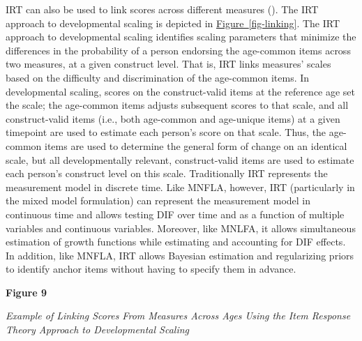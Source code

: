 \documentclass[
  american,
  letterpaper,
  12pt]{article}
\newcommand{\apafloattitle}[1]{%
  {\par\noindent\bfseries #1\par\nopagebreak}}
\newcommand{\apafloatcaption}[1]{%
  {\par\noindent\itshape\interlinepenalty10000 #1\par\nopagebreak}}
\newlength{\apatablekeepdepth}
\newcommand{\apatablekeep}{%
  \par\setlength{\apatablekeepdepth}{\prevdepth}%
  \setbox\apatablekeepbox\vbox\bgroup\prevdepth\apatablekeepdepth}
\newcommand{\apafigureskip}{%
  \par\ifdim\prevdepth>0pt\vskip-\prevdepth\prevdepth=0pt\fi
  \vspace{1.2em}}
\begin{document}
IRT can also be used to link scores across different measures
(). The IRT approach to
developmental scaling is depicted in
\hyperref[fig-linking]{Figure~\ref*{fig-linking}}. The IRT approach to
developmental scaling identifies scaling parameters that minimize the
differences in the probability of a person endorsing the age-common
items across two measures, at a given construct level. That is, IRT
links measures' scales based on the difficulty and discrimination of the
age-common items. In developmental scaling, scores on the
construct-valid items at the reference age set the scale; the age-common
items adjusts subsequent scores to that scale, and all construct-valid
items (i.e., both age-common and age-unique items) at a given timepoint
are used to estimate each person's score on that scale. Thus, the
age-common items are used to determine the general form of change on an
identical scale, but all developmentally relevant, construct-valid items
are used to estimate each person's construct level on this scale.
Traditionally IRT represents the measurement model in discrete time.
Like MNFLA, however, IRT (particularly in the mixed model formulation)
can represent the measurement model in continuous time and allows
testing DIF over time and as a function of multiple variables and
continuous variables. Moreover, like MNLFA, it allows simultaneous
estimation of growth functions while estimating and accounting for DIF
effects. In addition, like MNFLA, IRT allows Bayesian estimation and
regularizing priors to identify anchor items without having to specify
them in advance.

\par\addvspace{\baselineskip}\begingroup

\setlength{\parindent}{0pt}

\captionsetup{type=figure}

\apatablekeep

\setcounter{figure}{8}

\def\theHfigure{\arabic{figure}}%
%
\makeatletter\def\@currentlabel{9}\makeatother%
\label{fig-linking}

\apafloattitle{Figure 9}

\apafloatcaption{Example of Linking Scores From Measures Across Ages
Using the Item Response Theory Approach to Developmental Scaling}

\apafigureskip

\end{document}
